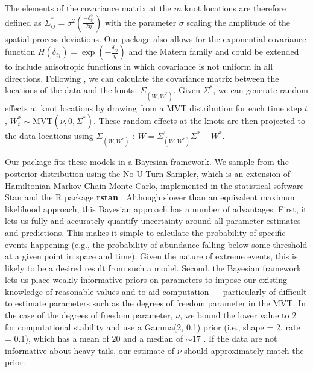\documentclass[12pt,english]{article}
\begin{document}
\begin{spacing}{1.3}
The elements of the covariance matrix at the $m$ knot locations are therefore
defined as $\Sigma_{ij}^*=\sigma^2 \left( \frac{-\delta_{ij}^2}{2 \eta}  \right)$ with the
parameter $\sigma$ scaling the amplitude of the spatial process deviations. Our
package also allows for the exponential covariance function $H(\delta_{ij}) =
\exp \left(-\frac{\delta_{ij} }{\eta} \right)$ and the Matern family and could be
extended to include anisotropic functions in which covariance is not uniform
in all directions. Following \citet{latimer2009}, we can calculate the
covariance matrix between the locations of the data and the knots,
$\Sigma_{\left(W, W^* \right)}$.
Given $\Sigma^*$, we can generate random effects at knot
locations by drawing from a MVT distribution for each time step $t$,
$W_t^*\sim \mathrm{MVT}\left( \nu, 0, \Sigma^{*} \right)$.
These random effects at the knots are then projected to the data locations using
$\Sigma_{\left( W,W^{*} \right)}$ \citep{latimer2009}:
$W=\Sigma_{\left(W,W^* \right)}^{'} \Sigma^{*-1}W^*$.

Our package fits these models in a Bayesian framework. We sample
from the posterior distribution using the No-U-Turn Sampler, which is an
extension of Hamiltonian Markov Chain Monte Carlo, implemented in the
statistical software Stan \citep{standevelopmentteam2016a, carpenter2017}
and the R package \textbf{rstan} \citep{standevelopmentteam2016}. Although slower
than an equivalent maximum likelihood approach, this Bayesian approach has a
number of advantages. First, it lets us fully and accurately quantify
uncertainty around all parameter estimates and predictions. This makes it
simple to calculate the probability of specific events happening (e.g., the
probability of abundance falling below some threshold at a given point in space
and time). Given the nature of extreme events, this is likely to be a desired
result from such a model. Second, the Bayesian framework lets us place weakly
informative priors on parameters to impose our existing knowledge of reasonable
values and to aid computation --- particularly of difficult to estimate
parameters such as the degrees of freedom parameter in the MVT. In the case of
the degrees of freedom parameter, $\nu$, we bound the lower value to $2$ for
computational stability and use a Gamma(2, 0.1) prior (i.e., shape = 2, rate = 0.1),
which has a mean of $20$ and a median of $\sim 17$ \citep{juarez2010}.
If the data are not informative about heavy
tails, our estimate of $\nu$ should approximately match the prior.


\end{spacing}
\end{document}
